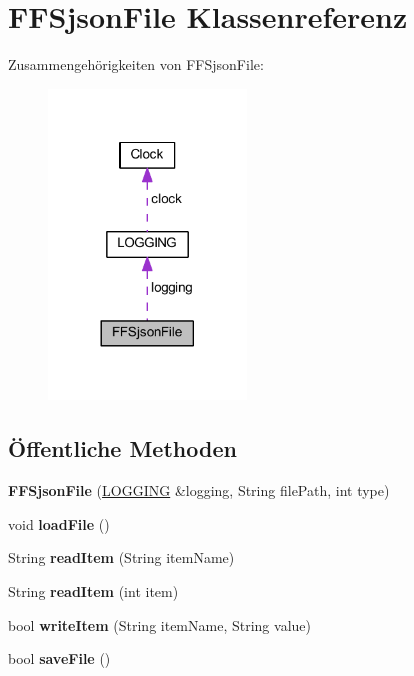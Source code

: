 \hypertarget{class_f_f_sjson_file}{}\section{F\+F\+Sjson\+File Klassenreferenz}
\label{class_f_f_sjson_file}


Zusammengehörigkeiten von F\+F\+Sjson\+File\+:\nopagebreak
\begin{figure}[H]
\begin{center}
\leavevmode
\includegraphics[width=149pt]{class_f_f_sjson_file__coll__graph}
\end{center}
\end{figure}
\subsection*{Öffentliche Methoden}
\begin{DoxyCompactItemize}
\item 
\mbox{\label{class_f_f_sjson_file_aa4393b7da47cccc2a814c1341cff4955}} 
{\bfseries F\+F\+Sjson\+File} (\hyperlink{class_l_o_g_g_i_n_g}{L\+O\+G\+G\+I\+NG} \&logging, String file\+Path, int type)
\item 
\mbox{\label{class_f_f_sjson_file_a401e5929ca848aebeec6b32ef8a78383}} 
void {\bfseries load\+File} ()
\item 
\mbox{\label{class_f_f_sjson_file_a9a0f18ad2d55bcffb605d66a47d212d3}} 
String {\bfseries read\+Item} (String item\+Name)
\item 
\mbox{\label{class_f_f_sjson_file_a1063b4ab2e854c77e5f8080b62c4f6de}} 
String {\bfseries read\+Item} (int item)
\item 
\mbox{\label{class_f_f_sjson_file_a3fb3b4ff7dbfb9e52d11af0047bdce1f}} 
bool {\bfseries write\+Item} (String item\+Name, String value)
\item 
\mbox{\label{class_f_f_sjson_file_a157ab2e2736a52931ded20986af0f46a}} 
bool {\bfseries save\+File} ()
\end{DoxyCompactItemize}
